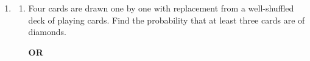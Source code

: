 \begin{enumerate}[label=\thesubsection.\arabic*, ref=\thesubsection.\theenumi]
\solution (i) For any $a, b\in\mathbb{Z}$, $2a^2+b\in\mathbb{Z}$, so $*$ maps $\mathbb{Z}\times\mathbb{Z}\to\mathbb{Z}$ and is a binary operation. \\[4pt]
(ii) From \eqref{eq:EE26BTECH11225-binop}:
\begin{align}
    a * b = 2a^2 + b, \quad b * a = 2b^2 + a
\end{align}
For $a=1$, $b=2$:
\begin{align}
    1 * 2 = 2(1)^2 + 2 = 4, \quad 2 * 1 = 2(2)^2 + 1 = 9 \implies 1*2 \neq 2*1
\end{align}
Hence $*$ is a binary operation but it is not commutative.

    \item
    \begin{enumerate}[label=(\alph*), leftmargin=1.5em, labelsep=0.5em]
        \item Four cards are drawn one by one with replacement from a well-shuffled deck of playing cards. Find the probability that at least three cards are of diamonds.

        \begin{center}
            \textbf{OR}
        \end{center}


\end{enumerate}
\end{enumerate}
